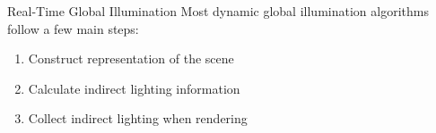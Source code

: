 \documentclass[10pt]{beamer}
\begin{document}


\begin{frame}{Real-Time Global Illumination}
  Most dynamic global illumination algorithms follow a few main steps:

  \begin{enumerate}
    \item Construct representation of the scene
    \item Calculate indirect lighting information
    \item Collect indirect lighting when rendering
  \end{enumerate}

\end{frame}
\end{document}
